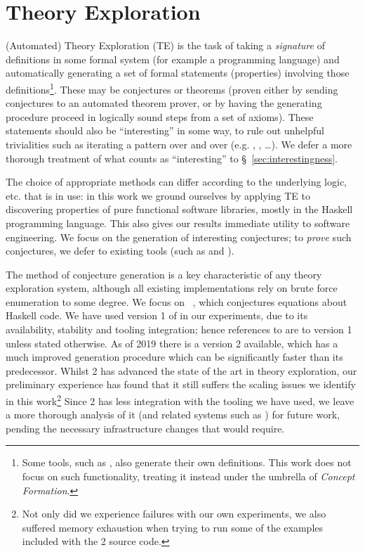 \section{Theory Exploration}
\label{sec:theoryexploration}

(Automated) Theory Exploration (TE) is the task of taking a \emph{signature}
of definitions in some formal system (for example a programming language) and
automatically generating a set of formal statements (properties) involving
those definitions\footnote{Some tools, such as \isascheme{}, also generate their
  own definitions. This work does not focus on such functionality, treating it
  instead under the umbrella of \emph{Concept Formation}.}. These may be
conjectures or theorems (proven either by sending conjectures to an automated
theorem prover, or by having the generating procedure proceed in logically sound
steps from a set of axioms). These statements should also be ``interesting'' in
some way, to rule out unhelpful trivialities such as iterating a pattern over
and over (e.g. , , \dots). We defer a more
thorough treatment of what counts as ``interesting'' to
\S~\ref{sec:interestingness}.

The choice of appropriate methods can differ according to the underlying logic,
etc. that is in use: in this work we ground ourselves by applying TE to
discovering properties of pure functional software libraries, mostly in the
Haskell programming language. This also gives our results immediate utility to
software engineering. We focus on the generation of interesting conjectures; to
\emph{prove} such conjectures, we defer to existing tools (such as \hip{} and
\hipspec{}).

The method of conjecture generation is a key characteristic of any theory
exploration system, although all existing implementations rely on brute force
enumeration to some degree. We focus on \quickspec{}~\cite{QuickSpec}, which
conjectures equations about Haskell code. We have used version 1 of \quickspec{}
in our experiments, due to its availability, stability and tooling integration;
hence references to \quickspec{} are to version 1 unless stated otherwise. As of
2019 there is a \quickspec{} version 2 available, which has a much improved
generation procedure which can be significantly faster than its predecessor.
Whilst \quickspec{} 2 has advanced the state of the art in theory exploration,
our preliminary experience has found that it still suffers the scaling issues we
identify in this work\footnote{Not only did we experience failures with our own
  experiments, we also suffered memory exhaustion when trying to run some of the
  examples included with the \quickspec{} 2 source code.} Since \quickspec{} 2
has less integration with the tooling we have used, we leave a more thorough
analysis of it (and related systems such as \speculate{}) for future work,
pending the necessary infrastructure changes that would require.

